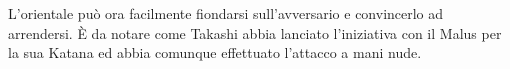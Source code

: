 {L'orientale pu\`o ora facilmente fiondarsi sull'avversario e
convincerlo ad arrendersi.  \`E da notare come Takashi abbia lanciato
l'iniziativa con il Malus per la sua Katana ed abbia comunque
effettuato l'attacco a mani nude.
}

\fi
